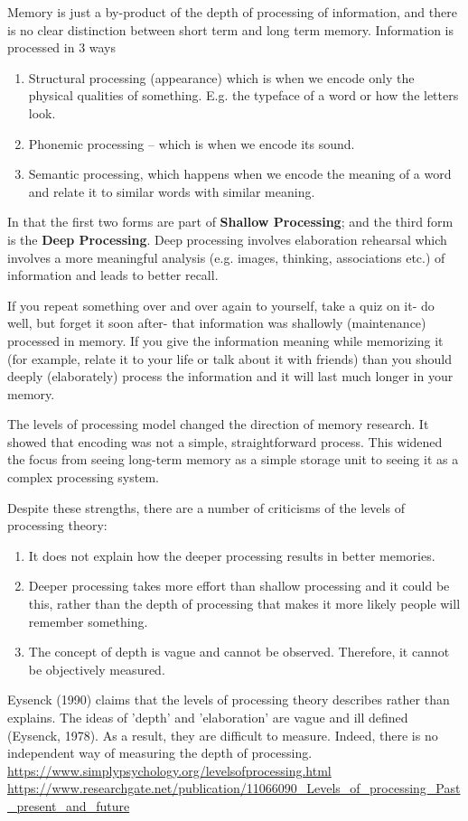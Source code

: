 Memory is just a by-product of the depth of processing of information, and there
is no clear distinction between short term and long term memory. Information is processed in 3 ways
\begin{enumerate}
  \item   Structural processing (appearance) which is when we encode only the physical qualities of something.  E.g. the typeface of a word or how the letters look.
  
  \item  Phonemic processing – which is when we encode its sound.
  
  \item Semantic processing, which happens when we encode the meaning of a word and relate it to similar words with similar meaning.
  
\end{enumerate}

In that the first two forms are part of {\bf Shallow Processing}; and the third
form is the {\bf Deep Processing}.
Deep processing involves elaboration rehearsal which involves a more meaningful
analysis (e.g. images, thinking, associations etc.) of information and leads to
better recall.


If you repeat something over and over again to yourself, take a quiz on it- do
well, but forget it soon after- that information was shallowly (maintenance)
processed in memory.  If you give the information meaning while memorizing it
(for example, relate it to your life or talk about it with friends) than you
should deeply (elaborately) process the information and it will last much longer
in your memory.

The levels of processing model changed the direction of memory research. It
showed that encoding was not a simple, straightforward process. This widened the
focus from seeing long-term memory as a simple storage unit to seeing it as a
complex processing system.


Despite these strengths, there are a number of criticisms of the levels of processing theory:
\begin{enumerate}
  \item  It does not explain how the deeper processing results in better memories. 
  
  \item Deeper processing takes more effort than shallow processing and it could
  be this, rather than the depth of processing that makes it more likely people
  will remember something.
  
  \item The concept of depth is vague and cannot be observed. Therefore, it cannot be objectively measured. 
\end{enumerate}
Eysenck (1990) claims that the levels of processing theory describes rather than explains. 
The ideas of 'depth' and 'elaboration' are vague and ill defined (Eysenck, 1978). 
As a result, they are difficult to measure. Indeed, there is no independent way of measuring the depth of processing.
\url{https://www.simplypsychology.org/levelsofprocessing.html}
\url{https://www.researchgate.net/publication/11066090_Levels_of_processing_Past_present_and_future}

